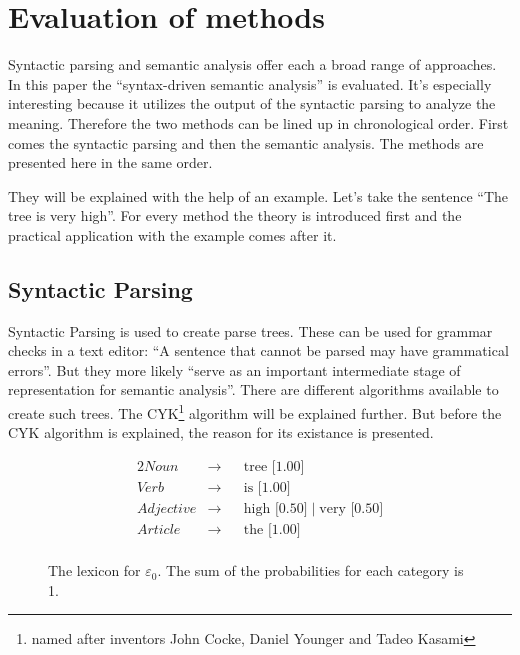 \documentclass[12pt,twoside]{scrartcl}
\theoremstyle{plain}
\theoremstyle{definition}
\theoremstyle{remark}
\begin{document}
\section{Evaluation of methods}
\label{sec:evalMethods}
	
	
	Syntactic parsing and semantic analysis offer each a broad range of approaches. In this paper the ``syntax-driven semantic analysis''\cite[p.~617]{Jurafsky2009} is evaluated. It's especially interesting because it utilizes the output of the syntactic parsing to analyze the meaning. Therefore the two methods can be lined up in chronological order. First comes the syntactic parsing and then the semantic analysis. The methods are presented here in the same order. 
	
	They will be explained with the help of an example. Let's take the sentence ``The tree is very high''. For every method the theory is introduced first and the practical application with the example comes after it.
	
	\subsection{Syntactic Parsing}
	\label{subSec:syntacticParsing}
		Syntactic Parsing is used to create parse trees. These can be used for grammar checks in a text editor: ``A sentence that cannot be parsed may have grammatical errors''\cite[p.~461]{Jurafsky2009b}. But they more likely ``serve as an important intermediate stage of representation for semantic analysis''\cite[p.~461]{Jurafsky2009b}. There are different algorithms available to create such trees. The CYK\footnote{named after inventors John Cocke, Daniel Younger and Tadeo Kasami\cite[p.~893]{Russel2010}} algorithm will be explained further. But before the CYK algorithm is explained, the reason for its existance is presented.
		
		\begin{figure}
			\begin{alignat*}{2}
				Noun &\rightarrow && \text{tree [1.00]} \\
				Verb &\rightarrow && \text{is [1.00]} \\
				Adjective &\rightarrow && \text{high [0.50]} \;|\; \text{very [0.50]} \\
				Article &\rightarrow && \text{the [1.00]} \\
			\end{alignat*}
			\caption{The lexicon for $\varepsilon_{0}$. The sum of the probabilities for each category is 1.}
			\label{fig:lexicon}
		\end{figure}
		
\end{document}
